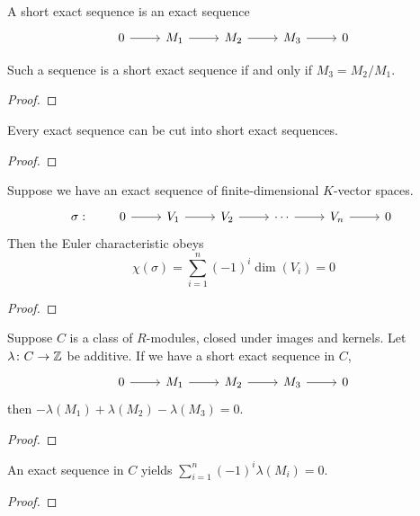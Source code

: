 \begin{definition}
    A short exact sequence is an exact sequence
    \begin{equation*}
        \begin{tikzcd}
            0 \arrow{r} & M_1 \arrow{r} & M_2 \arrow{r} & M_3 \arrow{r} & 0
        \end{tikzcd}
    \end{equation*}
\end{definition}
\begin{proposition}
    Such a sequence is a short exact sequence if and only if \(M_3 = M_2/M_1\).
\end{proposition}
\begin{proof}
    
\end{proof}
\begin{theorem}
    Every exact sequence can be cut into short exact sequences.
\end{theorem}
\begin{proof}
    
\end{proof}

\begin{proposition}
    Suppose we have an exact sequence of finite-dimensional \(K\)-vector spaces.
    \begin{equation*}
        \sigma: \qquad
        \begin{tikzcd}
            0 \arrow{r} & V_1 \arrow{r} & V_2 \arrow{r} & \cdots \arrow{r} &
            V_n \arrow{r} & 0
        \end{tikzcd}
    \end{equation*}
    Then the Euler characteristic obeys
    \begin{equation*}
        \chi(\sigma) = \sum_{i=1}^n {(-1)}^i \dim(V_i) = 0
    \end{equation*}
\end{proposition}
\begin{proof}
    
\end{proof}
\begin{lemma}
    Suppose \(C\) is a class of \(R\)-modules,
    closed under images and kernels.
    Let \(\lambda\colon C\to\mathbb{Z}\) be additive.
    If we have a short exact sequence in \(C\),
    \begin{equation*}
        \begin{tikzcd}
            0 \arrow{r} & M_1 \arrow{r} & M_2 \arrow{r} & M_3 \arrow{r} & 0
        \end{tikzcd}
    \end{equation*}
    then \(-\lambda(M_1) + \lambda(M_2) - \lambda(M_3) = 0\).
\end{lemma}
\begin{proof}
    
\end{proof}
\begin{theorem}
    An exact sequence in \(C\) yields \(\sum_{i=1}^n {(-1)}^i \lambda(M_i) = 0\).
\end{theorem}
\begin{proof}
    
\end{proof}

